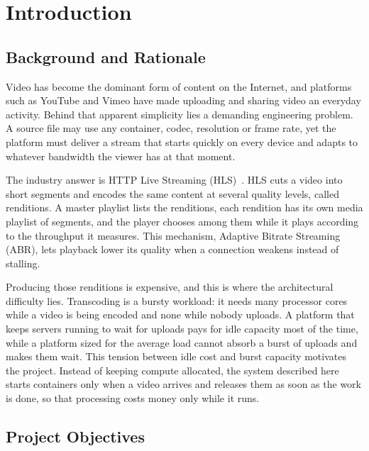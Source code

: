 \chapter{Introduction}
\label{chap:introduction}

\section{Background and Rationale}
\label{sec:background}

Video has become the dominant form of content on the Internet, and platforms such as YouTube and
Vimeo have made uploading and sharing video an everyday activity. Behind that apparent simplicity
lies a demanding engineering problem. A source file may use any container, codec, resolution or
frame rate, yet the platform must deliver a stream that starts quickly on every device and adapts
to whatever bandwidth the viewer has at that moment.

The industry answer is HTTP Live Streaming (HLS)~\cite{rfc8216}. HLS cuts a video into short
segments and encodes the same content at several quality levels, called renditions. A master
playlist lists the renditions, each rendition has its own media playlist of segments, and the
player chooses among them while it plays according to the throughput it measures. This mechanism,
Adaptive Bitrate Streaming (ABR), lets playback lower its quality when a connection weakens instead
of stalling.

Producing those renditions is expensive, and this is where the architectural difficulty lies.
Transcoding is a bursty workload: it needs many processor cores while a video is being encoded and
none while nobody uploads. A platform that keeps servers running to wait for uploads pays for idle
capacity most of the time, while a platform sized for the average load cannot absorb a burst of
uploads and makes them wait. This tension between idle cost and burst capacity motivates the
project. Instead of keeping compute allocated, the system described here starts containers only
when a video arrives and releases them as soon as the work is done, so that processing costs money
only while it runs.

\section{Project Objectives}
\label{sec:objectives}

